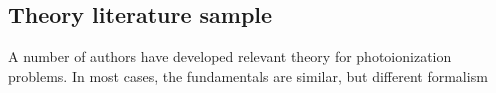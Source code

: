 \subsection{Theory literature sample\label{sec:theory-lit}}

A number of authors have developed relevant theory for photoionization problems. In most cases, the fundamentals are similar, but different formalism 
